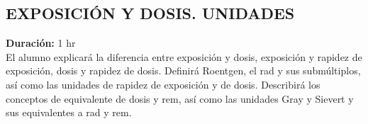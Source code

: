 \subsection{EXPOSICIÓN Y DOSIS. UNIDADES}
\textbf{Duración:} 1 hr\\
El alumno explicará la diferencia entre exposición y dosis, exposición y rapidez de exposición, dosis y rapidez de dosis. Definirá Roentgen, el rad y sus submúltiplos, así como las unidades de rapidez de exposición y de dosis. Describirá los conceptos de equivalente de dosis y rem, así como las unidades Gray y Sievert y sus equivalentes a rad y rem.